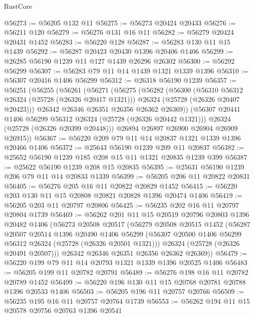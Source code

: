 \begin{lexlean}{RustCore}
\begin{coremodule}
@56273 := @56205 @132 @11
@56275 := @56273 @20424 @20433
@56276 := @56211 @120
@56279 := @56276 @131 @16 @11
@56282 := @56279 @20424 @20431 @1452
@56283 := @56220 @128
@56287 := @56283 @130 @11 @15 @1439
@56292 := @56287 @20423 @20430 @1396 @20406 @1406
@56299 := @26285 @56190 @1239 @11 @127 @1439 @26296 @26302
@56300 := @56292 @56299
@56307 := @56283 @79 @11 @14 @1439 @1321 @1339 @1396
@56310 := @56307 @20416 @1406 @56299
@56312 := @26318 @56190 @1239
@56357 := @56251
    (@56255
      (@56261
        (@56271
          (@56275
            (@56282
              (@56300
                (@56310 @56312 @26324 (@25728 (@26326 @20417 @1321)))
                @26324
                (@25728 (@26326 @20407 @20423)))
              @26342
              @26346
              @26351
              @26356
              @26362
              @26369))
          (@56307 @20441 @1406 @56299 @56312 @26324 (@25728 (@26326 @20442 @1321)))
          @26324
          (@25728 (@26326 @20399 @20448)))
        @26894
        @26897
        @26900
        @26904
        @26909
        @26915))
@56367 := @56220 @209 @79 @11 @14 @20837 @1321 @1339 @1396 @20466 @1406
@56372 := @25643 @56190 @1239 @209 @11 @20837
@56382 := @25652 @56190 @1239 @185 @208 @15 @11 @1321 @20835 @1239 @399
@56387 := @25622 @56190 @1239 @208 @15 @20835
@56395 := @25631 @56190 @1239 @206 @79 @11 @14 @20833 @1339
@56399 := @56205 @206 @11 @20822 @20831
@56405 := @56276 @205 @16 @11 @20822 @20829 @1452
@56415 := @56220 @203 @130 @11 @15 @20808 @20821 @20828 @1396 @20474 @1406
@56419 := @56205 @203 @11 @20797 @20806
@56425 := @56235 @202 @16 @11 @20797 @20804 @1739
@56469 := @56262
    @201
    @11
    @15
    @20519
    @20796
    @20803
    @1396
    @20482
    @1406
    (@56273
      @20508
      @20517
      (@56279
        @20508
        @20515
        @1452
        (@56287
          @20507
          @20514
          @1396
          @20490
          @1406
          @56299
          (@56307 @20500 @1406 @56299 @56312 @26324 (@25728 (@26326 @20501 @1321)))
          @26324
          (@25728 (@26326 @20491 @20507)))
        @26342
        @26346
        @26351
        @26356
        @26362
        @26369))
@56479 := @56220 @199 @79 @11 @14 @20793 @1321 @1339 @1396 @20525 @1406
@56483 := @56205 @199 @11 @20782 @20791
@56489 := @56276 @198 @16 @11 @20782 @20789 @1452
@56499 := @56220 @196 @130 @11 @15 @20768 @20781 @20788 @1396 @20533 @1406
@56503 := @56205 @196 @11 @20757 @20766
@56509 := @56235 @195 @16 @11 @20757 @20764 @1739
@56553 := @56262
    @194
    @11
    @15
    @20578
    @20756
    @20763
    @1396
    @20541

\end{coremodule}
\end{lexlean}
